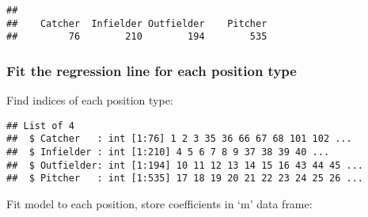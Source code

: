 \documentclass[
]{article}
\newenvironment{Shaded}{\begin{snugshade}}{\end{snugshade}}
\newcommand{\AttributeTok}[1]{\textcolor[rgb]{0.77,0.63,0.00}{#1}}
\newcommand{\ControlFlowTok}[1]{\textcolor[rgb]{0.13,0.29,0.53}{\textbf{#1}}}
\newcommand{\DecValTok}[1]{\textcolor[rgb]{0.00,0.00,0.81}{#1}}
\newcommand{\FunctionTok}[1]{\textcolor[rgb]{0.00,0.00,0.00}{#1}}
\newcommand{\NormalTok}[1]{#1}
\newcommand{\OtherTok}[1]{\textcolor[rgb]{0.56,0.35,0.01}{#1}}
\newcommand{\SpecialCharTok}[1]{\textcolor[rgb]{0.00,0.00,0.00}{#1}}
\begin{document}
\begin{verbatim}
## 
##    Catcher  Infielder Outfielder    Pitcher 
##         76        210        194        535
\end{verbatim}

\hypertarget{fit-the-regression-line-for-each-position-type}{%
\subsubsection{Fit the regression line for each position
type}\label{fit-the-regression-line-for-each-position-type}}

Find indices of each position type:

\begin{Shaded}
\end{Shaded}

\begin{verbatim}
## List of 4
##  $ Catcher   : int [1:76] 1 2 3 35 36 66 67 68 101 102 ...
##  $ Infielder : int [1:210] 4 5 6 7 8 9 37 38 39 40 ...
##  $ Outfielder: int [1:194] 10 11 12 13 14 15 16 43 44 45 ...
##  $ Pitcher   : int [1:535] 17 18 19 20 21 22 23 24 25 26 ...
\end{verbatim}

Fit model to each position, store coefficients in `m' data frame:

\begin{Shaded}
\end{Shaded}
\end{document}
